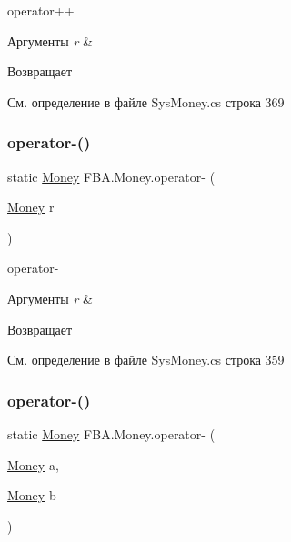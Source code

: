 operator++ 


\begin{DoxyParams}{Аргументы}
{\em r} & \\
\hline
\end{DoxyParams}
\begin{DoxyReturn}{Возвращает}

\end{DoxyReturn}


См. определение в файле Sys\+Money.\+cs строка 369

\mbox{\label{struct_f_b_a_1_1_money_a64164337f91a6ed7827f7b2275b7d2e1}} 
\subsubsection{\texorpdfstring{operator-\/()}{operator-()}\hspace{0.1cm}{\footnotesize\ttfamily [1/2]}}
{\footnotesize\ttfamily static \mbox{\hyperlink{struct_f_b_a_1_1_money}{Money}} F\+B\+A.\+Money.\+operator-\/ (\begin{DoxyParamCaption}\item[{\mbox{\hyperlink{struct_f_b_a_1_1_money}{Money}}}]{r }\end{DoxyParamCaption})\hspace{0.3cm}{\ttfamily [static]}}



operator-\/ 


\begin{DoxyParams}{Аргументы}
{\em r} & \\
\hline
\end{DoxyParams}
\begin{DoxyReturn}{Возвращает}

\end{DoxyReturn}


См. определение в файле Sys\+Money.\+cs строка 359

\mbox{\label{struct_f_b_a_1_1_money_a1ac5c8eb71a4d5b2cb37b87aea2d0c75}} 
\subsubsection{\texorpdfstring{operator-\/()}{operator-()}\hspace{0.1cm}{\footnotesize\ttfamily [2/2]}}
{\footnotesize\ttfamily static \mbox{\hyperlink{struct_f_b_a_1_1_money}{Money}} F\+B\+A.\+Money.\+operator-\/ (\begin{DoxyParamCaption}\item[{\mbox{\hyperlink{struct_f_b_a_1_1_money}{Money}}}]{a,  }\item[{\mbox{\hyperlink{struct_f_b_a_1_1_money}{Money}}}]{b }\end{DoxyParamCaption})\hspace{0.3cm}{\ttfamily [static]}}



